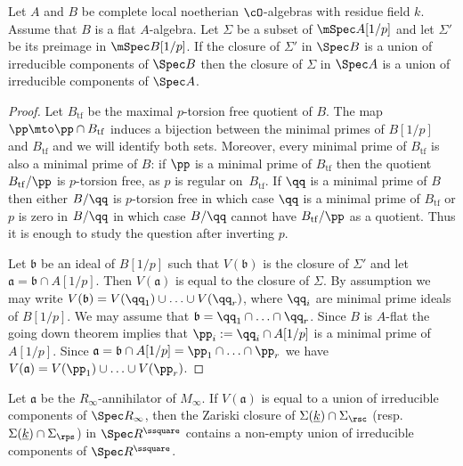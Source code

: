 \begin{lem}\label{going_down} Let $A$ and $B$ be complete local noetherian $\cO$-algebras with residue field $k$. Assume that
$B$ is a flat $A$-algebra. Let $\Sigma$ be a subset of $\mSpec A[1/p]$ and let $\Sigma'$ be its preimage in
$\mSpec B[1/p]$. If the closure of $\Sigma'$ in $\Spec B$ is a union of irreducible components of $\Spec B$ then
the closure of $\Sigma$ in $\Spec A$ is a union of irreducible components of $\Spec A$.
\end{lem}

\begin{proof} Let $B_{\mathrm{tf}}$ be the maximal $p$-torsion free quotient of $B$. The map $\pp\mto \pp \cap B_{\mathrm{tf}}$ induces a bijection between the minimal primes of $B[1/p]$ and
$B_{\mathrm{tf}}$ and we will identify both sets. Moreover, every minimal prime of $B_{\mathrm{tf}}$
is also a minimal prime of $B$: if $\pp$ is a minimal prime of $B_{\mathrm{tf}}$ then the
quotient $B_{\mathrm{tf}}/\pp$ is $p$-torsion free, as $p$ is regular on~$B_{\mathrm{tf}}$. If $\qq$ is a minimal prime of $B$ then either $B/\qq$ is $p$-torsion free
in which case $\qq$ is a minimal prime of $B_{\mathrm{tf}}$ or $p$ is zero in $B/\qq$ in which case
$B/\qq$ cannot have $B_{\mathrm{tf}}/\pp$ as a quotient. Thus it is enough to study the question after inverting $p$.

Let $\mathfrak b$ be an ideal of $B[1/p]$ such that $V(\mathfrak b)$ is the closure of $\Sigma'$ and
let \hbox{$\mathfrak a= \mathfrak b \cap A[1/p]$}. Then $V(\mathfrak a)$ is equal to the closure of $\Sigma$. By assumption we may write
\hbox{$V(\mathfrak b)= V(\qq_1)\cup\ldots \cup V(\qq_r)$}, where $\qq_i$ are minimal prime ideals of $B[1/p]$. We may assume that
$\mathfrak b = \qq_1\cap \ldots \cap \qq_r$. Since $B$ is $A$-flat the going down theorem implies that $\pp_i:=\qq_i \cap A[1/p]$ is a minimal prime
of $A[1/p]$. Since $\mathfrak a= \mathfrak b \cap A[1/p]= \pp_1\cap \ldots \cap \pp_r$ we have $V(\mathfrak a)= V(\pp_1)\cup \ldots \cup V(\pp_r)$.
\end{proof}

\begin{cor}\label{local} Let $\mathfrak a$ be the $R_{\infty}$-annihilator of $M_{\infty}$. If $V(\mathfrak a)$ is equal to a union of irreducible components of $\Spec R_{\infty}$,
then the Zariski closure of $\Sigma(\underline{k}) \cap \Sigma_{\rsc}$ (resp. $\Sigma(\underline{k}) \cap \Sigma_{\rps}$) in $\Spec R^\ssquare$
contains a non-empty
union of irreducible components of $\Spec R^\ssquare$.
\end{cor}

